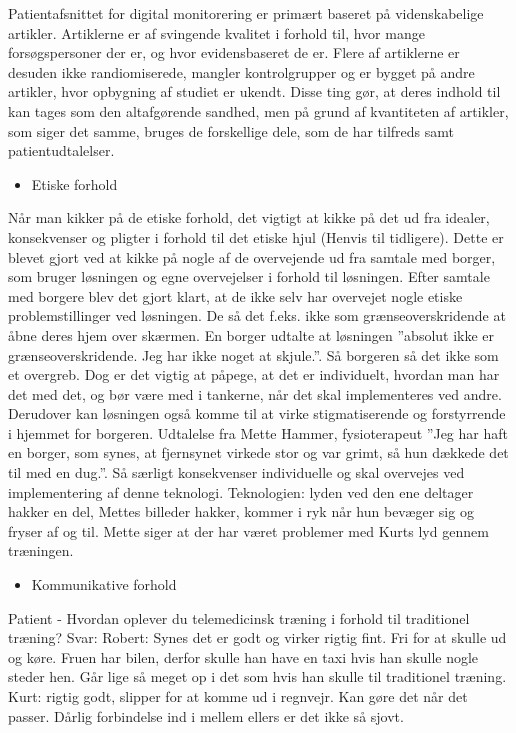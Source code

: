 Patientafsnittet for digital monitorering er primært baseret på videnskabelige artikler. Artiklerne er af svingende kvalitet i forhold til, hvor mange forsøgspersoner der er, og hvor evidensbaseret de er. Flere af artiklerne er desuden ikke randiomiserede, mangler kontrolgrupper og er bygget på andre artikler, hvor opbygning af studiet er ukendt. Disse ting gør, at deres indhold til kan tages som den altafgørende sandhed, men på grund af kvantiteten af artikler, som siger det samme, bruges de forskellige dele, som de har tilfreds samt patientudtalelser.

\begin{itemize}
	\item Etiske forhold
\end{itemize}
Når man kikker på de etiske forhold, det vigtigt at kikke på det ud fra idealer, konsekvenser og pligter i forhold til det etiske hjul (Henvis til tidligere). Dette er blevet gjort ved at kikke på nogle af de overvejende ud fra samtale med borger, som bruger løsningen og egne overvejelser i forhold til løsningen. Efter samtale med borgere blev det gjort klart, at de ikke selv har overvejet nogle etiske problemstillinger ved løsningen. De så det f.eks. ikke som grænseoverskridende at åbne deres hjem over skærmen. En borger udtalte at løsningen ”absolut ikke er grænseoverskridende. Jeg har ikke noget at skjule.”. Så borgeren så det ikke som et overgreb. Dog er det vigtig at påpege, at det er individuelt, hvordan man har det med det, og bør være med i tankerne, når det skal implementeres ved andre. Derudover kan løsningen også komme til at virke stigmatiserende og forstyrrende i hjemmet for borgeren. Udtalelse fra Mette Hammer, fysioterapeut ”Jeg har haft en borger, som synes, at fjernsynet virkede stor og var grimt, så hun dækkede det til med en dug.”. Så særligt konsekvenser individuelle og skal overvejes ved implementering af denne teknologi. Teknologien: lyden ved den ene deltager hakker en del, Mettes billeder hakker, kommer i ryk når hun bevæger sig og fryser af og til. Mette siger at der har været problemer med Kurts lyd gennem træningen.

\newpage
\begin{itemize}
	\item Kommunikative forhold
\end{itemize}
Patient
-	Hvordan oplever du telemedicinsk træning i forhold til traditionel træning?
Svar:
Robert: Synes det er godt og virker rigtig fint. Fri for at skulle ud og køre. Fruen har bilen, derfor skulle han have en taxi hvis han skulle nogle steder hen. Går lige så meget op i det som hvis han skulle til traditionel træning. Kurt: rigtig godt, slipper for at komme ud i regnvejr. Kan gøre det når det passer. Dårlig forbindelse ind i mellem ellers er det ikke så sjovt.


